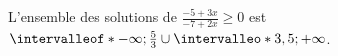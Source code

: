 \begin{exr}
\begin{enumerate}
\begin{enumerate}
\vspace*{0.5ex}
L'ensemble des solutions de $\frac{-5+3x}{-7+2x}\geqslant 0$ est $\intervalleof*{-\infty;\frac53}\cup\intervalleo*{3,5;+\infty}$.
    \end{enumerate}
\end{enumerate}
\end{exr}
%
%
%
